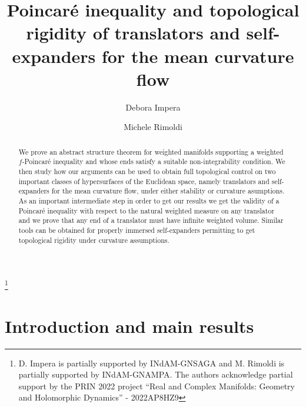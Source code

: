 \documentclass[11pt, leqno]{amsart}
\begin{document}
\title[Poincar\'e inequality and topological rigidity]{Poincar\'e inequality and topological rigidity of translators and self-expanders for the mean curvature flow}

\thanks{D. Impera is partially supported by INdAM-GNSAGA and M. Rimoldi is partially supported by INdAM-GNAMPA. The authors acknowledge partial support by the PRIN 2022 project ``Real and Complex Manifolds: Geometry and Holomorphic Dynamics'' - 2022AP8HZ9}




\author[Debora Impera]{Debora Impera}
\address[Debora Impera]{Dipartimento di Scienze Matematiche ``Giuseppe Luigi Lagrange", Politecnico di Torino, Corso Duca degli Abruzzi, 24, Torino, Italy, I-10129}

\author[Michele Rimoldi]{Michele Rimoldi}
\address[Michele Rimoldi]{Dipartimento di Scienze Matematiche ``Giuseppe Luigi Lagrange", Politecnico di Torino, Corso Duca degli Abruzzi, 24, Torino, Italy, I-10129}




\begin{abstract}
We prove an abstract structure theorem for weighted manifolds supporting a weighted $f$-Poincar\'e inequality and whose ends satisfy a suitable non-integrability condition. We then study how our arguments can be used to obtain full topological control on two important classes of hypersurfaces of the Euclidean space, namely translators and self-expanders for the mean curvature flow, under either stability or curvature asumptions. 
As an important intermediate step in order to get our results we get the validity of a Poincar\'e inequality with respect to the natural weighted measure on any translator and we prove that any end of a translator must have infinite weighted volume. Similar tools can be obtained for properly immersed self-expanders permitting to get topological rigidity under curvature assumptions.
\end{abstract}


\maketitle

\section{Introduction and main results}\label{Sect_Intro}
\end{document}
